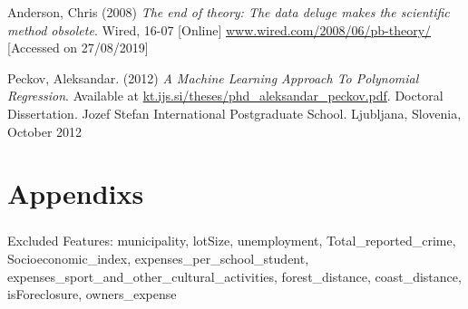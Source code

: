 \documentclass[12pt,a4paper]{article}
\begin{document}
Anderson, Chris (2008) \textit{The end of theory: The data deluge makes the scientific method obsolete}. Wired, 16-07 [Online] \href{https://www.wired.com/2008/06/pb-theory/}{www.wired.com/2008/06/pb-theory/} [Accessed on 27/08/2019]\newline

Peckov, Aleksandar. (2012)  \textit{A Machine Learning Approach To Polynomial Regression}. Available at \href{http://kt.ijs.si/theses/phd_aleksandar_peckov.pdf}{kt.ijs.si/theses/phd\_aleksandar\_peckov.pdf}. Doctoral Dissertation. Jozef Stefan International Postgraduate School. Ljubljana, Slovenia, October 2012


\newpage
\section{Appendixs}
\subsubsection{}
Excluded Features:\newline
municipality, lotSize, unemployment, Total\_reported\_crime, Socioeconomic\_index, expenses\_per\_school\_student, expenses\_sport\_and\_other\_cultural\_activities, forest\_distance, coast\_distance, isForeclosure, owners\_expense
\end{document}
